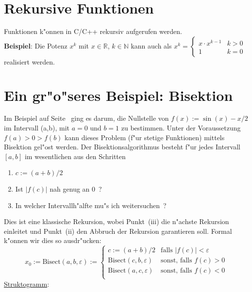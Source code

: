 \section{Rekursive Funktionen}
\label{p:7.7}
Funktionen k"onnen  in C/C++ rekursiv aufgerufen werden.
\\
\textbf{Beispiel}: Die Potenz $x^k$ mit $x\in {\mathbb{R}}$, $k\in {\mathbb{N}}$
kann auch als
$
x^k = \begin{cases} x\cdot x^{k-1} & k>0 \\ 1 &  k=0\end{cases}
$
realisiert werden.
\pagebreak[3]
%
%
%
\section{Ein gr"o"seres Beispiel: Bisektion}
\label{p:7.8}
%
Im Beispiel auf Seite~\pageref{bsp:bisection0} ging es darum, die
Nullstelle von $f(x):=\sin(x)-x/2$ im Intervall (a,b), mit
$a=0$ und $b=1$ zu bestimmen.
Unter der Voraussetzung $f(a) > 0 > f(b)$ kann dieses Problem
(f"ur stetige Funktionen)
mittels Bisektion gel"ost werden.
Der Bisektionsalgorithmus besteht f"ur jedes Intervall $[a,b]$
im wesentlichen aus den Schritten
\begin{enumerate}
 \renewcommand {\labelenumi}{(\roman{enumi})}
 \item $c:=(a+b)/2$
 \item Ist $|f(c)|$ nah genug an $0$~?
 \item In welcher Intervallh"alfte mu"s ich weitersuchen~?
\end{enumerate}
Dies ist eine klassische Rekursion, wobei
Punkt~(iii) die n"achste Rekursion einleitet und Punkt~(ii)
den Abbruch der Rekursion garantieren soll. Formal k"onnen wir dies so
ausdr"ucken:
$$
 x_0 := \text{Bisect} (a,b,\varepsilon) :=
 \begin{cases}
  c:=(a+b)/2 & \text{falls } |f(c)| < \varepsilon \\
  \text{Bisect} (c,b,\varepsilon) & \text{sonst, falls } f(c) > 0 \\
  \text{Bisect} (a,c,\varepsilon) & \text{sonst, falls } f(c) < 0 \\
 \end{cases}
$$
%
\underline{Struktogramm}: \\
